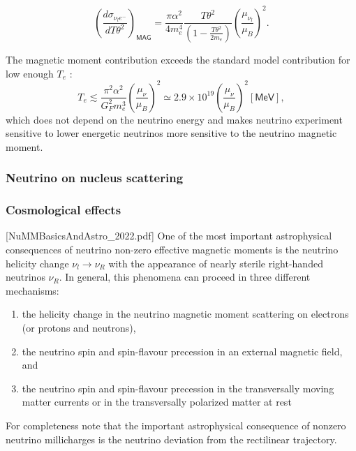 \begin{equation}
\left(\frac{d\sigma_{\nu_le^-}}{dT\theta^2}\right)_{\textsf{MAG}}=\frac{\pi\alpha^2}{4m_e^4}\frac{T\theta^2}{\left(1-\frac{T\theta^2}{2m_e}\right)}\left(\frac{\mu_{\nu_l}}{\mu_B}\right)^2.
\end{equation}

The magnetic moment contribution exceeds the standard model contribution for low enough $T_e$ \cite{nuElmagInt2015.pdf}:
\begin{equation}
T_e\lesssim\frac{\pi^2\alpha^2}{G_F^2m_e^3}\left(\frac{\mu_{\nu}}{\mu_B}\right)^2\simeq 2.9\times 10^{19}\left(\frac{\mu_{\nu}}{\mu_B}\right)^2\left[\textsf{MeV}\right],
\end{equation}
which does not depend on the neutrino energy and makes neutrino experiment sensitive to lower energetic neutrinos more sensitive to the neutrino magnetic moment.

\subsubsection{Neutrino on nucleus scattering}

\subsubsection{Cosmological effects}

[NuMMBasicsAndAstro\_2022.pdf]
One of the most important astrophysical consequences of neutrino non-zero effective magnetic moments is the neutrino helicity change $\nu_l\rightarrow\nu_R$ with the appearance of nearly sterile right-handed neutrinos $\nu_R$. In general, this phenomena can proceed in three different mechanisms:
\begin{enumerate}
\item the helicity change in the neutrino magnetic moment scattering on electrons (or protons and neutrons),
\item the neutrino spin and spin-flavour precession in an external magnetic field, and
\item the neutrino spin and spin-flavour precession in the transversally moving matter currents or in the transversally polarized matter at rest
\end{enumerate}
For completeness note that the important astrophysical consequence of nonzero neutrino millicharges is the neutrino deviation from the rectilinear trajectory.
